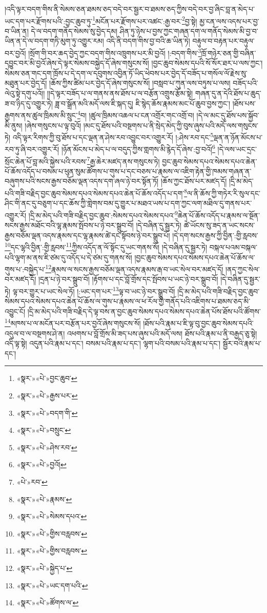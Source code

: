 །འདི་ལྟར་བདག་གིས་ནི་སེམས་ཅན་ཐམས་ཅད་བདེ་བར་སྦྱར་བ་ཐམས་ཅད་ཀྱིས་བདེ་བར་བྱ་ཞིང་བླ་ན་མེད་པ་ཡང་དག་པར་རྫོགས་པའི་:བྱང་ཆུབ་ཏུ་\footnote{«སྣར་»«པེ་»བྱང་ཆུབ་}མངོན་པར་རྫོགས་པར་འཚང་:རྒྱ་བར་\footnote{«སྣར་»«པེ་»རྒྱས་པར་}བྱ་སྟེ། མྱ་ངན་ལས་འདས་པར་བྱ་བ་ཡིན་ན། དེ་ལ་བདག་གནོད་སེམས་སུ་བྱེད་དམ། ཤིན་ཏུ་ཉེས་པ་བྱས་ཀྱང་གཞན་དག་ལ་གནོད་སེམས་མི་བྱ་བ་ཡིན་ན་དེ་ལ་བདག་གཏི་མུག་ཏུ་འགྱུར་རམ། འདི་ནི་བདག་གིས་བྱ་བའི་ཆ་ཡིན་ཏེ། བརྟུལ་བ་བརྟན་པར་བརྟུལ་བར་བྱའོ། །སྲོག་གི་བར་ཆད་བྱེད་ཀྱང་བདག་གིས་འཁྲུགས་པར་མི་བྱའོ། །:བདག་གིས་\footnote{«སྣར་»«པེ་»བདག་གི་}ཁྲོ་གཉེར་ཅན་གྱི་བཞིན་དབྱུང་བར་མི་བྱའོ་ཞེས་དེ་ལྟར་སེམས་བསྐྱེད་དོ་ཞེས་གསུངས་སོ། །བྱང་ཆུབ་སེམས་དཔའི་སོ་སོར་ཐར་པ་ལས་ཀྱང་། སེམས་ཅན་གང་དག་ཁྲོས་པ་དེ་དག་ལ་དབུགས་འབྱིན་ཏོ་ཡིད་ཕེབས་པར་བྱེད་དོ་བཟོད་པ་གསོལ་ལོ་རྗེས་སུ་མཐུན་པར་བྱེད་དོ། །ཆོས་ཀྱིས་ཚིམ་པར་བྱེད་དོ་ཞེས་གསུངས་སོ། །བསླབ་པ་ཀུན་ལས་བཏུས་པ་ལས། བཟོད་པའི་ལེའུ་སྟེ་དགུ་པའོ།། །།དེ་ལྟར་བཟོད་པ་ལ་གནས་ནས་ཐོས་པ་ལ་བརྩོན་འགྲུས་རྩོམ་སྟེ། གཞན་དུ་ན་དེའི་ཐོས་པ་ཆུད་ཟ་བ་ཉིད་དུ་འགྱུར་ཏེ། ཟླ་བ་སྒྲོན་མའི་མདོ་ལས་ཇི་སྐད་དུ། ཇི་སྙེད་ཆོས་རྣམས་མང་པོ་ཆུབ་བྱས་ཀྱང་། །ཐོས་པས་རྒྱགས་ནས་ཚུལ་ཁྲིམས་མི་སྲུང་\footnote{«སྣར་»«པེ་»བསྲུང་}བ། །ཚུལ་ཁྲིམས་འཆལ་པ་ངན་འགྲོར་གང་འགྲོ་བ། །དེ་ལ་མང་དུ་ཐོས་པས་སྐྱོབ་མི་ནུས། །ཞེས་གསུངས་པ་ལྟ་བུའོ། །མང་དུ་ཐོས་པའི་བསྔགས་པ་ནི་སྲེད་མེད་ཀྱི་བུས་ཞུས་པའི་མདོ་ལས་གསུངས་ཏེ། འདི་ལྟར་རིགས་ཀྱི་བུ་ཐོས་པ་དང་ལྡན་ན་ཤེས་རབ་འབྱུང་བར་འགྱུར་རོ། །:ཤེས་རབ་དང་\footnote{«སྣར་»«པེ་»ཤེས་རབ་}ལྡན་ན་ཉོན་མོངས་པ་རབ་ཏུ་ཞི་བར་འགྱུར་རོ། །ཉོན་མོངས་པ་མེད་པ་ལ་བདུད་ཀྱིས་གླགས་མི་རྙེད་དོ་ཞེས་:བྱ་བའོ།\footnote{«སྣར་»«པེ་»བྱའོ།} །དེ་ལས་ཡང་དྲང་སྲོང་ཆེན་པོ་བླ་མའི་སྐྱེས་པའི་རབས་\footnote{«པེ་»རབ་}རྒྱ་ཆེར་མཛད་ནས་གསུངས་ཏེ། བྱང་ཆུབ་སེམས་དཔའ་སེམས་དཔའ་ཆེན་པོ་ཆོས་འདོད་པ་བསམ་པ་ཕུན་སུམ་ཚོགས་པ་གུས་པ་དང་བཅས་པ་རྣམས་ལ་འཇིག་རྟེན་གྱི་ཁམས་གཞན་ན་བཞུགས་པའི་སངས་རྒྱས་བཅོམ་ལྡན་འདས་དག་ཞལ་ཉེ་བར་སྟོན་ཏོ། །ཆོས་ཀྱང་ཐོས་པར་མཛད་དོ། །དྲི་མ་མེད་པའི་གཟི་བརྗིད་བྱང་ཆུབ་སེམས་དཔའ་སེམས་དཔའ་ཆེན་པོ་ཆོས་འདོད་པ་དག་\footnote{«སྣར་»«པེ་»རྣམས་}ལ་ནི་ཆོས་ཀྱི་གཏེར་རི་སུལ་དང་ཤིང་གི་ནང་དུ་བཅུག་པ་དང་ཆོས་ཀྱི་གླེགས་བམ་དུ་གྱུར་པ་མཐའ་ཡས་པ་དག་ཀྱང་ལག་མཐིལ་དུ་གནས་པར་འགྱུར་རོ། །དྲི་མ་མེད་པའི་གཟི་བརྗིད་བྱང་ཆུབ་:སེམས་དཔའ་སེམས་དཔའ་\footnote{«སྣར་»«པེ་»སེམས་དཔའ་}ཆེན་པོ་ཆོས་འདོད་པ་རྣམས་ལ་སྔོན་སངས་རྒྱས་མཐོང་བའི་ལྷ་རྣམས་སྤོབས་པ་ཉེ་བར་སྒྲུབ་བོ། །དེ་བཞིན་དུ་སྦྱར་ཏེ། ཚེ་ཡོངས་སུ་ཟད་ན་ཡང་སངས་རྒྱས་བཅོམ་ལྡན་འདས་རྣམས་དང་ལྷ་རྣམས་ཚེ་དང་སྟོབས་ཉེ་བར་སྒྲུབ་པོ། །དེ་དག་སངས་རྒྱས་ཀྱི་བྱིན་:གྱི་རླབས་\footnote{«སྣར་»«པེ་»གྱིས་བརླབས་}དང་ལྷའི་བྱིན་:གྱི་རླབས་\footnote{«སྣར་»«པེ་»གྱིས་བརླབས་}ཀྱིས་འདོད་ན་ལོ་སྟོང་དུ་ཡང་གནས་སོ། །དེ་བཞིན་དུ་སྦྱར་ཏེ། བསྐལ་པའམ་བསྐལ་པའི་ལྷག་མ་ནས་ཇི་ཙམ་དུ་འདོད་པ་དེ་ཙམ་དུ་གནས་སོ། །བྱང་ཆུབ་སེམས་དཔའ་སེམས་དཔའ་ཆེན་པོ་ཆོས་ལ་གུས་པ་:བསྐྱེད་པ་\footnote{«སྣར་»«པེ་»སྐྱེད་པ་}རྣམས་ལ་སངས་རྒྱས་བཅོམ་ལྡན་འདས་རྣམས་རྒ་བ་ཡང་སེལ་བར་མཛད་དོ། །ནད་ཀྱང་སེལ་བར་མཛད་དོ། །དྲན་པ་ཉེ་བར་སྒྲུབ་བོ། །རྟོགས་པ་དང་བློ་གྲོས་དང་སྤོབས་པ་ཡང་ཉེ་བར་སྒྲུབ་བོ། །དེ་བཞིན་དུ་སྦྱར་ཏེ། ལྟ་བར་གྱུར་པ་ཡང་སེལ་ཏོ། །:ཡང་དག་པར་\footnote{«སྣར་»«པེ་»ཡང་དག་པའི་}ལྟ་བ་ཡང་ཉེ་བར་སྒྲུབ་བོ། །དྲི་མ་མེད་པའི་གཟི་བརྗིད་བྱང་ཆུབ་སེམས་དཔའ་སེམས་དཔའ་ཆེན་པོ་ཆོས་ལ་གུས་པ་རྣམས་ལ་ཕ་རོལ་གྱི་གནོད་པའི་འཇིགས་པ་ཐམས་ཅད་མི་འབྱུང་ངོ། །དྲི་མ་མེད་པའི་གཟི་བརྗིད་དེ་ལྟ་བས་ན་བྱང་ཆུབ་སེམས་དཔའ་སེམས་དཔའ་ཆེན་པོས་ཐོས་པའི་ཚོགས་\footnote{«སྣར་»«པེ་»ཚོགས་ལ་}མཁས་པ་ལ་མངོན་པར་བརྩོན་པར་བྱའོ་ཞེས་གསུངས་སོ། །ཐོས་པའི་རྣམ་པ་ཇི་ལྟ་བུ་བྱང་ཆུབ་སེམས་དཔའི་འདུལ་བ་ལ་བསྔགས་ཤེ་ན། འཕགས་པ་བློ་གྲོས་མི་ཟད་པས་ཞུས་པའི་མདོ་ལས། ཐོས་པའི་རྣམ་པ་ནི་བརྒྱད་ཅུ་སྟེ། འདི་ལྟ་སྟེ། འདུན་པའི་རྣམ་པ་དང་། བསམ་པའི་རྣམ་པ་དང་། ལྷག་པའི་བསམ་པའི་རྣམ་པ་དང་། སྦྱོར་བའི་རྣམ་པ་དང་། 